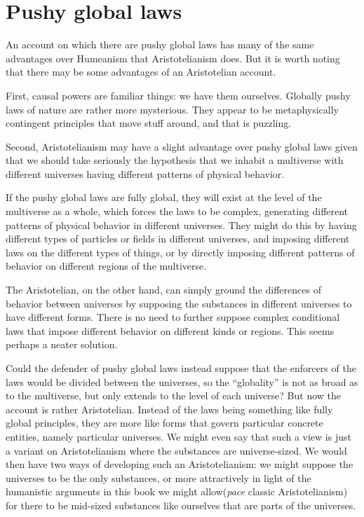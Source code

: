 \section{Pushy global laws}
An account on which there are pushy global laws has many of the same advantages over Humeanism that Aristotelianism
does. But it is worth noting that there may be some advantages of an Aristotelian account.

First, causal powers are familiar things: we have them ourselves. Globally pushy laws of nature are rather more mysterious. 
They appear to be metaphysically contingent principles that move stuff around, and that is puzzling.

Second, Aristotelianism may have a slight advantage over pushy global laws given that we should take seriously
the hypothesis that we inhabit a multiverse with different universes having different patterns of physical behavior. 

If the pushy global laws are fully global, they will exist at the level of the multiverse as a whole, which forces the
laws to be complex, generating different patterns of physical behavior in different universes. They might do this
by having different types of particles or fields in different universes, and imposing different laws on the 
different types of things, or by directly imposing different patterns of behavior on different regions of the multiverse.

The Aristotelian, on the other hand, can simply ground the differences of behavior between universes by supposing 
the substances in different universes to have different forms. There is no need to further suppose complex conditional 
laws that impose different behavior on different kinds or regions. This seems perhaps a neater solution.

Could the defender of pushy global laws instead suppose that the enforcers of the laws would be divided between the 
universes, so the ``globality'' is not as broad as to the multiverse, but only extends to the level of each universe?
But now the account is rather Aristotelian. Instead of the laws being something like fully global principles, they are 
more like forms that govern particular concrete entities, namely particular universes. We might even say that such a 
view is just a variant on Aristotelianism where the substances are universe-sized. We would then have two ways of 
developing such an Aristotelianism: we might suppose the universes to be the only substances, or more attractively 
in light of the humanistic arguments in this book we might allow(\textit{pace} classic Aristotelianism) for there to 
be mid-sized substances like ourselves that are parts of the universes. 


\chaptertail
